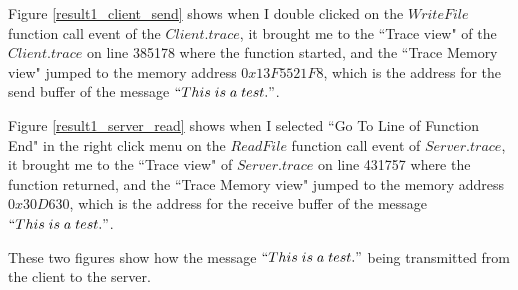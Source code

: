 Figure \ref{result1_client_send} shows when I double clicked on the $WriteFile$ function call event of the $Client.trace$, it brought me to the ``Trace view" of the $Client.trace$ on line 385178 where the function started, and the ``Trace Memory view" jumped to the memory address $0x13F5521F8$, which is the address for the send buffer of the message $``This\; is\; a\; test."$.

Figure \ref{result1_server_read} shows when I selected ``Go To Line of Function End" in the right click menu on the $ReadFile$ function call event of $Server.trace$, it brought me to the ``Trace view" of $Server.trace$ on line 431757 where the function returned, and the ``Trace Memory view" jumped to the memory address $0x30D630$, which is the address for the receive buffer of the message $``This\; is\; a\; test."$.

These two figures show how the message $``This\; is\; a\; test."$ being transmitted from the client to the server.


